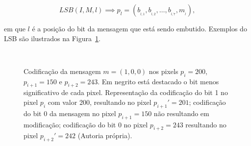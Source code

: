\begin{equation}
	LSB(I, M, l) \implies p_l = (b_{_{l,1}},b_{_{l,2}}, \dots, b_{_{l,7}}, m_{_l}),
\end{equation}

\noindent em que  $l$ é a posição do bit da mensagem que está sendo embutido. Exemplos do LSB são ilustrados na Figura~\ref{fig:lsb}.

\begin{figure}
	\centering
	 \
	 \
	 \
	\caption{Codificação da mensagem $m = (1, 0, 0)$ nos pixels $p_i = 200$, $p_{i+1} = 150$ e $p_{i+2} = 243$. Em negrito está destacado o bit menos significativo de cada pixel. \protect{} Representação da codificação do bit 1 no pixel $p_i$ com valor 200, resultando no pixel $p_{i+1}' = 201$; \protect{} codificação do bit 0 da mensagem no pixel $p_{i+1} = 150$ não resultando em modificação; \protect{} codificação do bit 0 no pixel $p_{i+2} = 243$ resultando no pixel $p_{i+2}' = 242$ (Autoria própria).}
	\label{fig:lsb}
\end{figure}

